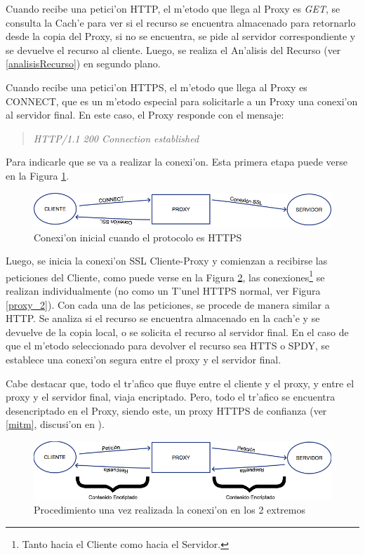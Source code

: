 Cuando recibe una petici'on HTTP, el m'etodo que llega al Proxy es \textit{GET}, se consulta la Cach'e para ver si el recurso se encuentra almacenado para retornarlo desde la copia del Proxy, si no se encuentra, se pide al servidor correspondiente y se devuelve el recurso al cliente. Luego, se realiza el An'alisis del Recurso (ver \ref{analisisRecurso}) en segundo plano.

Cuando recibe una petici'on HTTPS, el m'etodo que llega al Proxy es CONNECT, que es un m'etodo especial para solicitarle a un Proxy una conexi'on al servidor final. En este caso, el Proxy responde con el mensaje:
\begin{quote}
\textit{\textit{HTTP/1.1 200 Connection established}}
\end{quote}
Para indicarle que se va a realizar la conexi'on. Esta primera etapa puede verse en la Figura \ref{mitm1}.

\begin{figure}[h]
  	\centering
	\includegraphics[width=\textwidth]{img/mitm1}
	\caption{\small Conexi'on inicial cuando el protocolo es HTTPS}
	\label{mitm1}
\end{figure}

Luego, se inicia la conexi'on SSL Cliente-Proxy y comienzan a recibirse las peticiones del Cliente, como puede verse en la Figura \ref{mitm2}, las conexiones\footnote{Tanto hacia el Cliente como hacia el Servidor.} se realizan individualmente (no como un T'unel HTTPS normal, ver Figura \ref{proxy_2}). Con cada una de las peticiones, se procede de manera similar a HTTP. Se analiza si el recurso se encuentra almacenado en la cach'e y se devuelve de la copia local, o se solicita el recurso al servidor final. En el caso de que el m'etodo seleccionado para devolver el recurso sea HTTS o SPDY, se establece una conexi'on segura entre el proxy y el servidor final.

Cabe destacar que, todo el tr'afico que fluye entre el cliente y el proxy, y entre el proxy y el servidor final, viaja encriptado. Pero, todo el tr'afico se encuentra desencriptado en el Proxy, siendo este, un proxy HTTPS de confianza (ver \ref{mitm}, discusi'on en \citep{draftTrustedProxy}).

\begin{figure}[h]
  	\centering
	\includegraphics[width=\textwidth]{img/mitm2}
	\caption{\small Procedimiento una vez realizada la conexi'on en los 2 extremos}
	\label{mitm2}
\end{figure}

